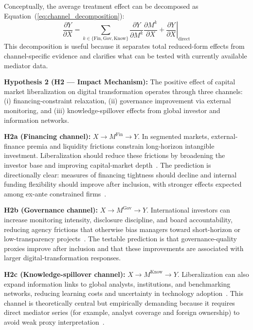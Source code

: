 Conceptually, the average treatment effect can be decomposed as Equation~(\ref{eq:channel_decomposition}):
\begin{equation}
\label{eq:channel_decomposition}
\frac{\partial Y}{\partial X} = \sum_{k \in \{\mathrm{Fin},\mathrm{Gov},\mathrm{Know}\}} \frac{\partial Y}{\partial M^k}\frac{\partial M^k}{\partial X} + \left.\frac{\partial Y}{\partial X}\right|_{\mathrm{direct}}
\end{equation}
This decomposition is useful because it separates total reduced-form effects from channel-specific evidence and clarifies what can be tested with currently available mediator data.

\textbf{Hypothesis 2 (H2 --- Impact Mechanism):} The positive effect of capital market liberalization on digital transformation operates through three channels: (i) financing-constraint relaxation, (ii) governance improvement via external monitoring, and (iii) knowledge-spillover effects from global investor and information networks.

\textbf{H2a (Financing channel):} $X \rightarrow M^{\mathrm{Fin}} \rightarrow Y$. In segmented markets, external-finance premia and liquidity frictions constrain long-horizon intangible investment. Liberalization should reduce these frictions by broadening the investor base and improving capital-market depth~\cite{Kose2003,LiPang2023,Hordofa2024,YLiu2024}. The prediction is directionally clear: measures of financing tightness should decline and internal funding flexibility should improve after inclusion, with stronger effects expected among ex-ante constrained firms~\cite{Huang2023}.

\textbf{H2b (Governance channel):} $X \rightarrow M^{\mathrm{Gov}} \rightarrow Y$. International investors can increase monitoring intensity, disclosure discipline, and board accountability, reducing agency frictions that otherwise bias managers toward short-horizon or low-transparency projects~\cite{Chen2025,Ma2025,CLi2023}. The testable prediction is that governance-quality proxies improve after inclusion and that these improvements are associated with larger digital-transformation responses.

\textbf{H2c (Knowledge-spillover channel):} $X \rightarrow M^{\mathrm{Know}} \rightarrow Y$. Liberalization can also expand information links to global analysts, institutions, and benchmarking networks, reducing learning costs and uncertainty in technology adoption~\cite{Zheng2021,Sun2022,Zhu2023,LiShen2021,WangWang2026}. This channel is theoretically central but empirically demanding because it requires direct mediator series (for example, analyst coverage and foreign ownership) to avoid weak proxy interpretation~\cite{LiuGu2026}.

